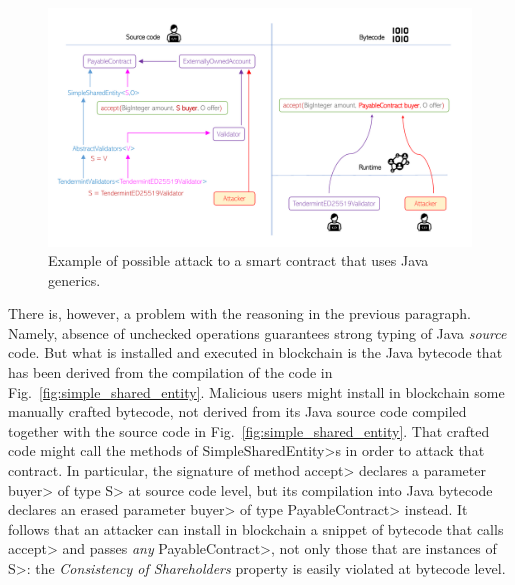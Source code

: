 \begin{figure}[ht]
\centering
\includegraphics[width=0.9\linewidth]{figures/attack}
\caption{Example of possible attack to a smart contract that uses Java generics.}
\label{figure.attack}
\end{figure}

There is, however, a problem with the reasoning
in the previous paragraph. Namely, absence of unchecked
operations guarantees strong typing of Java \emph{source} code. But what is installed
and executed in blockchain is the Java bytecode that has been derived from
the compilation of the code in Fig.~\ref{fig:simple_shared_entity}.
Malicious users might install in blockchain some manually crafted bytecode,
not derived from its Java source code compiled together with the source code
in Fig.~\ref{fig:simple_shared_entity}.
That crafted code might
call the methods of \<SimpleSharedEntity>s in order to attack
that contract. In particular,
the signature of method \<accept> declares a parameter \<buyer> of type \<S> at source code level, but
its compilation into Java bytecode declares an erased
parameter \<buyer> of type \<PayableContract> instead.
It follows that an attacker can install in blockchain a snippet of bytecode that calls
\<accept> and passes \emph{any} \<PayableContract>, not only those that are instances of \<S>:
the \emph{Consistency of Shareholders} property is easily violated at bytecode level.





